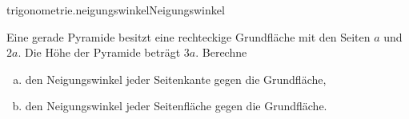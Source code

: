 \begin{exercise}{trigonometrie.neigungswinkel}{Neigungswinkel}
  \ifproblem\problem\par
    Eine gerade Pyramide besitzt eine rechteckige Grundfläche mit
    den Seiten $a$ und $2a$. Die Höhe der Pyramide beträgt $3a$.
    Berechne
    \begin{enumerate}[a)]
      \item den Neigungswinkel jeder Seitenkante gegen die Grundfläche,
      \item den Neigungswinkel jeder Seitenfläche gegen die Grundfläche.
    \end{enumerate}
  \fi
\end{exercise}
